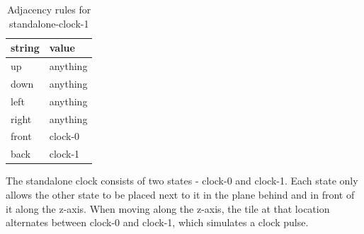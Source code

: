 \documentclass[letterpaper,11pt]{article}
\begin{document}
	\begin{table}[h!tbp]
		\centering
		\caption{Adjacency rules for standalone-clock-1}
		{\footnotesize %
		\begin{tabular}{|l|l|}
		\hline
		  string & value \\
		\hline
		up & anything \\
		\hline
		down & anything \\
		\hline
		left & anything \\
		\hline
		right & anything \\
		\hline
		front & clock-0 \\
		\hline
		back & clock-1 \\
		\hline
		\end{tabular}
		}
		\end{table}

The standalone clock consists of two states - clock-0 and clock-1. Each state only allows the other state to be placed next to it in the plane behind and in front of it along the z-axis. When moving along the z-axis, the tile at that location alternates between clock-0 and clock-1, which simulates a clock pulse.
\end{document}
